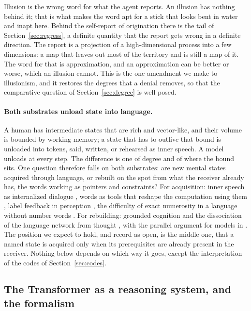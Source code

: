Illusion is the wrong word for what the agent reports. An illusion has nothing behind it; that is what
makes the word apt for a stick that looks bent in water and inapt here. Behind the self-report of
origination there is the tail of Section~\ref{sec:regress}, a definite quantity that the report gets
wrong in a definite direction. The report is a projection of a high-dimensional process into a few
dimensions: a map that leaves out most of the territory and is still a map of it. The word for that is
approximation, and an approximation can be better or worse, which an illusion cannot. This is the one
amendment we make to illusionism, and it restores the degrees that a denial removes, so that the
comparative question of Section~\ref{sec:degree} is well posed.

\paragraph{Both substrates unload state into language.}
\label{sec:language}
A human has intermediate states that are rich and vector-like, and their volume is bounded by working
memory; a state that has to outlive that bound is unloaded into tokens, said, written, or rehearsed as
inner speech. A model unloads at every step. The difference is one of degree and of where the bound
sits. One question therefore falls on both substrates: are new mental states acquired through
language, or rebuilt on the spot from what the receiver already has, the words working as pointers and
constraints? For acquisition: inner speech as internalized dialogue \citep{vygotsky1934}, words as
tools that reshape the computation using them \citep{clark1998}, label feedback in perception
\citep{lupyan2012}, the difficulty of exact numerosity in a language without number words
\citep{frank2008}. For rebuilding: grounded cognition \citep{barsalou1999} and the dissociation of
the language network from thought \citep{fedorenko2024}, with the parallel argument for models in
\citet{mahowald2024}. The position we expect to hold, and record as open, is the middle one, that a named state is acquired only when its
prerequisites are already present in the receiver. Nothing below depends on which way it goes, except
the interpretation of the codes of Section~\ref{sec:codes}.

\subsection{The Transformer as a reasoning system, and the formalism}
\label{sec:transformer}
\label{sec:formalism}

